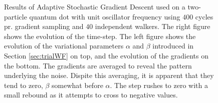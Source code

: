 \begin{figure}[h]
 \begin{center}
  \caption{Results of Adaptive Stochastic Gradient Descent used on a two-particle quantum dot with unit oscillator frequency using $400$ cycles pr. gradient sampling and $40$ independent walkers. The right figure shows the evolution of the time-step. The left figure shows the evolution of the variational parameters $\alpha$ and $\beta$ introduced in Section \ref{sec:trialWF} on top, and the evolution of the gradients on the bottom. The gradients are averaged to reveal the pattern underlying the noise. Dispite this averaging, it is apparent that they tend to zero, $\beta$ somewhat before $\alpha$. The step rushes to zero with a small rebound as it attempts to cross to negative values.}
  \label{fig:ASGD_Ex}
 \end{center}
\end{figure}


